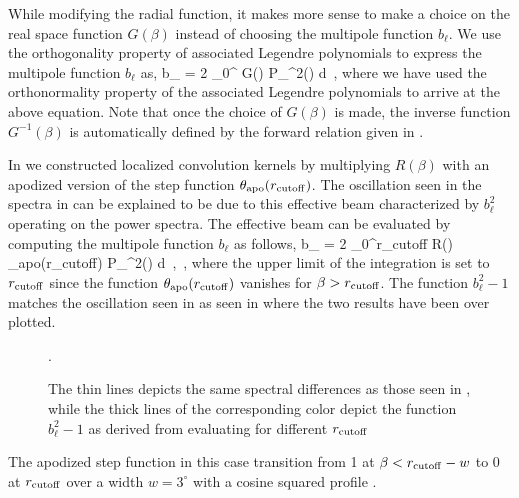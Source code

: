 While modifying the radial function, it makes more sense to make a choice on the real space function $G(\beta)$ instead of choosing the multipole function $b_{\ell}$. We use the orthogonality property of associated Legendre polynomials to express the multipole function $b_{\ell}$ as,
%
\beq
b_{\ell} = 2 \pi {} \int _{0}^{\pi} G(\beta) P_{\ell}^{2}(\cos{\beta}) d\cos{\beta} \,, \label{eq:gb2bl}
\eeq
%
where we have used the orthonormality property of the associated Legendre polynomials to arrive at the above equation. Note that once the choice of $G(\beta)$ is made, the inverse function $G^{-1}(\beta)$ is automatically defined by the forward relation given in .

In  we constructed localized convolution kernels by multiplying $R(\beta)$ with an apodized version of the step function $\theta_{\rm apo}(r_{\rm cutoff})$. The oscillation seen in the spectra in  can be explained to be due to this effective beam characterized by $b_{\ell}^2$ operating on the power spectra. The effective beam can be evaluated by computing the multipole function $b_{\ell}$ as follows,
%
\beq
b_{\ell} = 2 \pi {} \int _{0}^{r_{\rm cutoff}} R(\beta) \theta_{\rm apo}(r_{\rm cutoff})  P_{\ell}^{2}(\cos{\beta}) d\cos{\beta} \,, \label{eq:gb2bl} \,,
\eeq
%
where the upper limit of the integration is set to $r_{\rm cutoff}$ since the function $\theta_{\rm apo}(r_{\rm cutoff})$ vanishes for $\beta>r_{\rm cutoff}$. The function $b^2_{\ell}-1$ matches the oscillation seen in  as  seen in  where the two results have been over plotted.
%
\begin{figure}[!t] 
\centering
{}
\caption{The thin lines depicts the same spectral differences as those seen in , while the thick lines of the corresponding color depict the function $b_{\ell}^2 -1$ as derived from evaluating  for different $r_{\rm cutoff}$}.
\label{fig:match_cl_oscillations}
\end{figure}
%
The apodized step function in this case transition from 1 at $\beta < r_{\rm cutoff} -w$ to 0 at $r_{\rm cutoff}$ over a width $w= 3^{\circ}$ with a cosine squared profile .

